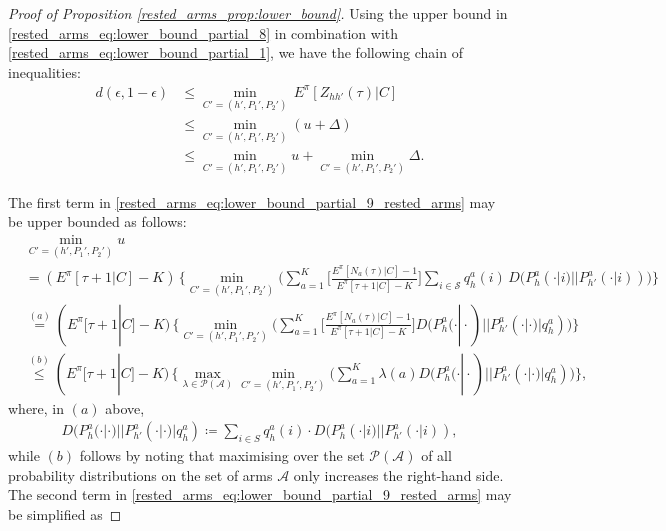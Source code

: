 \begin{proof}[Proof of Proposition \ref{rested_arms_prop:lower_bound}]
Using the upper bound in \eqref{rested_arms_eq:lower_bound_partial_8} in combination with \eqref{rested_arms_eq:lower_bound_partial_1}, we have the following chain of inequalities:
\begingroup\allowdisplaybreaks\begin{align}
d(\epsilon,1-\epsilon)
&\leq\min\limits_{C'=(h',P_1',P_2')}\,{E}^\pi[Z_{hh'}(\tau)|C]\nonumber\\
&\leq \min\limits_{C'=(h',P_1',P_2')}(u+\Delta)\nonumber\\
&\leq \min\limits_{C'=(h',P_1',P_2')} u+\min\limits_{C'=(h',P_1',P_2')} \Delta.\label{rested_arms_eq:lower_bound_partial_9_rested_arms}
\end{align}\endgroup

The first term in \eqref{rested_arms_eq:lower_bound_partial_9_rested_arms} may be upper bounded as follows:
{\color{black}
\begingroup\allowdisplaybreaks\begin{align}
&\min\limits_{C'=(h',P_1',P_2')}u \nonumber\\
&	
= (E^\pi[\tau+1|C]-K)\,\bigg\lbrace
\min\limits_{C'=(h',P_1',P_2')}\bigg(\sum\limits_{a=1}^{K}\bigg[\frac{E^\pi[N_a(\tau)|C]-1}{E^\pi[\tau+1|C]-K}\bigg]\sum\limits_{i\in\mathcal{S}}q_h^a(i)\, D(P_h^a(\cdot|i)||P_{h'}^a(\cdot|i))\bigg)\bigg\rbrace\nonumber\\
&\stackrel{(a)}{=} (E^\pi[\tau+1|C]-K)\,\bigg\lbrace
\min\limits_{C'=(h',P_1',P_2')}\bigg(\sum\limits_{a=1}^{K}\bigg[\frac{E^\pi[N_a(\tau)|C]-1}{E^\pi[\tau+1|C]-K}\bigg]
 D(P_h^a(\cdot|\cdot)||P_{h'}^a(\cdot|\cdot)|q_h^a)\bigg)\bigg\rbrace\nonumber\\
&\stackrel{(b)}{\leq} (E^\pi[\tau+1|C]-K)\,\bigg\lbrace\max\limits_{\lambda\in\mathcal{P}(\mathcal{A})}\min\limits_{C'=(h',P_1',P_2')}\bigg(\sum\limits_{a=1}^{K}\lambda(a) D(P_h^a(\cdot|\cdot)||P_{h'}^a(\cdot|\cdot)|q_h^a)\bigg)\bigg\rbrace,\label{rested_arms_eq:proof_of_prop_1_temp_1}
\end{align}\endgroup}
where, in $(a)$ above,
\begin{align*}
D(P_h^a(\cdot|\cdot)||P_{h'}^a(\cdot|\cdot)|q_h^a)\coloneqq \sum\limits_{i\in S}q_h^a(i)\cdot D(P_h^a(\cdot|i)||P_{h'}^a(\cdot|i)),
\end{align*}
while $(b)$ follows by noting that maximising over the set $\mathcal{P}(\mathcal{A})$ of all probability distributions on the set of arms $\mathcal{A}$ only increases the right-hand side. The second term in \eqref{rested_arms_eq:lower_bound_partial_9_rested_arms} may be simplified as

\end{proof}
